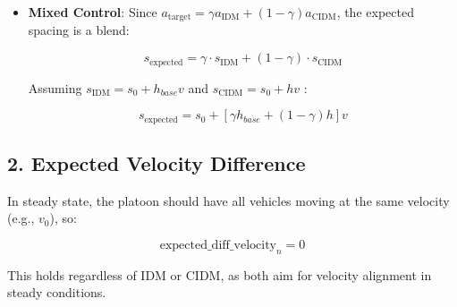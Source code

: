 \documentclass[letterpaper, 10pt, conference]{ieeeconf}  %
\begin{document}
\begin{itemize}
    \item \textbf{Mixed Control}: Since \(a_{\text{target}} = \gamma a_{\text{IDM}} + (1 - \gamma) a_{\text{CIDM}}\), the expected spacing is a blend:

    \[ s_{\text{expected}} = \gamma \cdot s_{\text{IDM}} + (1 - \gamma) \cdot s_{\text{CIDM}} \]

    Assuming \(s_{\text{IDM}} = s_0 + h_{base} v\) and \(s_{\text{CIDM}} = s_0 + h v\) :

    \[ s_{\text{expected}} = s_0 + [\gamma h_{base} + (1 - \gamma) h] v \]
\end{itemize}



\subsection*{2. Expected Velocity Difference}
In steady state, the platoon should have all vehicles moving at the same velocity (e.g., \(v_0\)), so:

\[ \text{expected\_diff\_velocity}_n = 0 \]

This holds regardless of IDM or CIDM, as both aim for velocity alignment in steady conditions.






\end{document}
